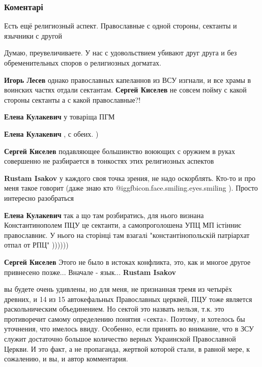  
 
 
 
 
\subsubsection{Коментарі}

\begin{itemize} %
Есть ещё религиозный аспект. Православные с одной стороны, сектанты и язычники с другой

\begin{itemize} %
Думаю, преувеличиваете. У нас с удовольствием убивают друг друга и без обременительных споров о религиозных догматах.

\textbf{Игорь Лесев} однако православных капеланнов из ВСУ изгнали, и все храмы в воинских частях отдали сектантам.
\textbf{Сергей Киселев} не совсем пойму с какой стороны сектанты а с какой православные?!

\textbf{Елена Кулакевич} у товаріща ПГМ

\textbf{Елена Кулакевич} , с обеих. )

\textbf{Сергей Киселев} подавляющее большинство воюющих с оружием в руках совершенно не разбирается в тонкостях этих религиозных аспектов

\textbf{Rustam Isakov} у каждого своя точка зрения, не надо оскорблять. Кто-то и про меня такое говорит (даже знаю кто  @igg{fbicon.face.smiling.eyes.smiling} ). Просто интересно разобраться

\textbf{Елена Кулакевич} так а що там розбиратись, для нього визнана Константинополем ПЦУ це сектанти, а самопроголошена УПЦ МП істінниє православниє. У нього на сторінці там взагалі "константінопольскій патріархат отпал от РПЦ" ))))))

\textbf{Сергей Киселев}
Этого не было в истоках конфликта, это, как и многое другое привнесено позже... Вначале - язык...
\textbf{Rustam Isakov} 

вы будете очень удивлены, но для меня, не признанная тремя из четырёх древних,
и 14 из 15 автокефальных Православных церквей, ПЦУ тоже является
раскольническим объединением. Но сектой это назвать нельзя, т.к. это
противоречит самому определению понятия «секта». Поэтому, и хотелось бы
уточнения, что имелось ввиду. Особенно, если принять во внимание, что в ЗСУ
служит достаточно большое количество верных Украинской Православной Церкви. И
это факт, а не пропаганда, жертвой которой стали, в равной мере, к сожалению, и
вы, и автор комментария.



\end{itemize}
\end{itemize}
